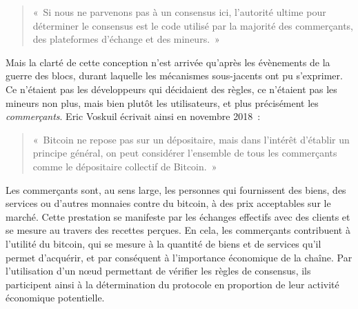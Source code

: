 \begin{quote}
«~Si nous ne parvenons pas à un consensus ici, l'autorité ultime pour déterminer le consensus est le code utilisé par la majorité des commerçants, des plateformes d'échange et des mineurs.~»
\end{quote} %

Mais la clarté de cette conception n'est arrivée qu'après les évènements de la guerre des blocs, durant laquelle les mécanismes sous-jacents ont pu s'exprimer. Ce n'étaient pas les développeurs qui décidaient des règles, ce n'étaient pas les mineurs non plus, mais bien plutôt les utilisateurs, et plus précisément les \emph{commerçants}. Eric Voskuil écrivait ainsi en novembre 2018~:

\begin{quote}
«~Bitcoin ne repose pas sur un dépositaire, mais dans l'intérêt d'établir un principe général, on peut considérer l'ensemble de tous les commerçants comme le dépositaire collectif de Bitcoin.~»
\end{quote}

Les commerçants sont, au sens large, les personnes qui fournissent des biens, des services ou d'autres monnaies contre du bitcoin, à des prix acceptables sur le marché. Cette prestation se manifeste par les échanges effectifs avec des clients et se mesure au travers des recettes perçues. En cela, les commerçants contribuent à l'utilité du bitcoin, qui se mesure à la quantité de biens et de services qu'il permet d'acquérir, et par conséquent à l'importance économique de la chaîne. Par l'utilisation d'un nœud permettant de vérifier les règles de consensus, ils participent ainsi à la détermination du protocole en proportion de leur activité économique potentielle.

